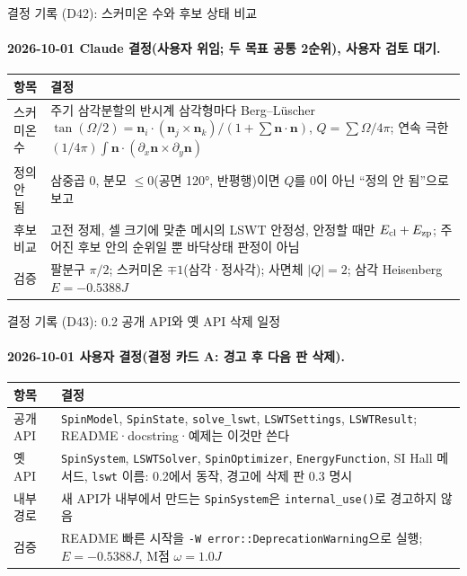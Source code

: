 \begin{frame}[label=decisions-d42-texture]{결정 기록 (D42): 스커미온 수와 후보 상태 비교}
  \framesubtitle{2026-10-01 Claude 결정(사용자 위임; 두 목표 공통 2순위), 사용자 검토 대기.}
  \small\renewcommand{\arraystretch}{1.12}
  \begin{tabularx}{\textwidth}{@{}P{3.0cm}Y@{}}
    \toprule
    항목 & 결정 \\
    \midrule
    스커미온 수 & 주기 삼각분할의 반시계 삼각형마다 Berg--L\"uscher $\tan(\Omega/2)=\mathbf n_i\cdot(\mathbf n_j\times\mathbf n_k)/(1+\sum\mathbf n\cdot\mathbf n)$, $Q=\sum\Omega/4\pi$; 연속 극한 $(1/4\pi)\int\mathbf n\cdot(\partial_x\mathbf n\times\partial_y\mathbf n)$ \\
    정의 안 됨 & 삼중곱 0, 분모 $\le 0$(공면 120°, 반평행)이면 $Q$를 0이 아닌 ``정의 안 됨''으로 보고 \\
    후보 비교 & 고전 정제, 셀 크기에 맞춘 메시의 LSWT 안정성, 안정할 때만 $E_{\rm cl}+E_{\rm zp}$; 주어진 후보 안의 순위일 뿐 바닥상태 판정이 아님 \\
    검증 & 팔분구 $\pi/2$; 스커미온 $\mp1$(삼각·정사각); 사면체 $|Q|=2$; 삼각 Heisenberg $E=-0.5388J$ \\
    \bottomrule
  \end{tabularx}
\end{frame}

\begin{frame}[label=decisions-d43-api]{결정 기록 (D43): 0.2 공개 API와 옛 API 삭제 일정}
  \framesubtitle{2026-10-01 사용자 결정(결정 카드 A: 경고 후 다음 판 삭제).}
  \small\renewcommand{\arraystretch}{1.12}
  \begin{tabularx}{\textwidth}{@{}P{3.0cm}Y@{}}
    \toprule
    항목 & 결정 \\
    \midrule
    공개 API & \texttt{SpinModel}, \texttt{SpinState}, \texttt{solve\_lswt}, \texttt{LSWTSettings}, \texttt{LSWTResult}; README·docstring·예제는 이것만 쓴다 \\
    옛 API & \texttt{SpinSystem}, \texttt{LSWTSolver}, \texttt{SpinOptimizer}, \texttt{EnergyFunction}, SI Hall 메서드, \texttt{lswt} 이름: 0.2에서 동작, 경고에 삭제 판 0.3 명시 \\
    내부 경로 & 새 API가 내부에서 만드는 \texttt{SpinSystem}은 \texttt{internal\_use()}로 경고하지 않음 \\
    검증 & README 빠른 시작을 \texttt{-W error::DeprecationWarning}으로 실행; $E=-0.5388J$, M점 $\omega=1.0J$ \\
    \bottomrule
  \end{tabularx}
\end{frame}

